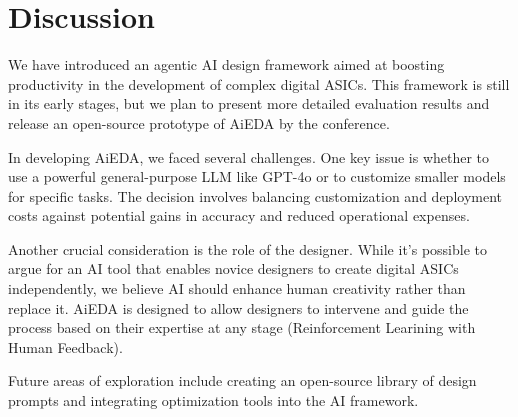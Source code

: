 \section{Discussion}
\label{sec:discussion}
We have introduced an agentic AI design framework aimed at boosting productivity in the development of complex digital ASICs. This framework is still in its early stages, but we plan to present more detailed evaluation results and release an open-source prototype of AiEDA by the conference.

In developing AiEDA, we faced several challenges. One key issue is whether to use a powerful general-purpose LLM like GPT-4o or to customize smaller models for specific tasks. The decision involves balancing customization and deployment costs against potential gains in accuracy and reduced operational expenses.

Another crucial consideration is the role of the designer. While it's possible to argue for an AI tool that enables novice designers to create digital ASICs independently, we believe AI should enhance human creativity rather than replace it. AiEDA is designed to allow designers to intervene and guide the process based on their expertise at any stage (Reinforcement Learining with Human Feedback). 

Future areas of exploration include creating an open-source library of design prompts and integrating optimization tools into the AI framework.